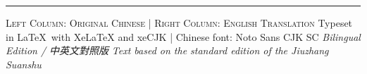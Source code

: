 \documentclass[11pt,a4paper]{article}
\begin{document}
\vspace{1cm}

\begin{center}
\rule{0.3\textwidth}{0.4pt}
\vspace{0.5cm}
{\small\textsc{Left Column: Original Chinese \quad | \quad Right Column: English Translation}}
\vspace{0.3cm}
{\small Typeset in \LaTeX\ with XeLaTeX and xeCJK \quad | \quad Chinese font: Noto Sans CJK SC}
\vspace{0.3cm}
{\small\textit{Bilingual Edition / 中英文對照版}}
{\small\textit{Text based on the standard edition of the Jiuzhang Suanshu}}
\end{center}
\end{document}
